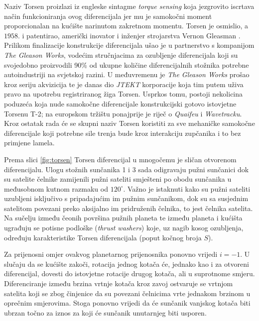\documentclass[11pt]{article}
\numberwithin{equation}{section}%
\begin{document}
Naziv Torsen proizlazi iz engleske sintagme \textit{torque sensing} koja jezgrovito iscrtava način funkcioniranja ovog diferencijala jer mu je samokočni moment proporcionalan na kućište narinutom zakretnom momentu. Torsen je osmislio, a $1958.$ i patentirao, američki inovator i inženjer strojarstva Vernon Gleasman \cite{popsci}. Prilikom finalizacije konstrukcije diferencijala ušao je u partnerstvo s kompanijom \textit{The Gleason Works}, vodećim stručnjacima za ozubljenje diferencijala koji su svojedobno proizvodili 90\% od ukupne količine diferencijalnih stožnika potrebne autoindustriji na svjetskoj razini. U međuvremenu je \textit{The Gleason Works} prošao kroz seriju akvizicija te je danas dio \textit{JTEKT} korporacije koja tim putem uživa pravo na upotrebu registriranog žiga Torsen. Usprkos tomu, postoji nekolicina poduzeća koja nude samokočne diferencijale konstrukcijski gotovo istovjetne Torsenu T-2; na europskom tržištu ponajprije je riječ o \textit{Quaifeu} i \textit{Wavetracku}. Kroz ostatak rada će se skupni naziv Torsen koristiti za sve mehaničke samokočne diferencijale koji potrebne sile trenja bude kroz interakciju zupčanika i to bez primjene lamela.
\par %
Prema slici \ref{fig:torsen} Torsen diferencijal u mnogočemu je sličan otvorenom diferencijalu. Ulogu stožnih sunčanika 1 i 3 sada odigravaju pužni sunčanici dok su satelite čelnike zamijenili pužni sateliti smješteni po obodu sunčanika u međusobnom kutnom razmaku od $120^\circ$. Važno je istaknuti kako su pužni sateliti uzubljeni isključivo s pripadajućim im pužnim sunčanikom, dok su sa susjednim satelitom povezani preko aksijalno im pridruženih čelnika, to jest čelnika satelita. Na sučelju između čeonih površina pužnih planeta te između planeta i kućišta ugrađuju se potisne podloške (\textit{thrust washers}) koje, uz nagib kosog ozubljenja, određuju karakteristike Torsen diferencijala (poput kočnog broja $S$).

Za prijenosni omjer ovakvog planetarnog prijenosnika ponovno vrijedi $i=-1$. U slučaju da se kućište zakoči, rotacija jednog kotača će, jednako kao i za otvoreni diferencijal, dovesti do istovjetne rotacije drugog kotača, ali u suprotnome smjeru. Diferenciranje između brzina vrtnje kotača kroz zavoj ostvaruje se vrtnjom satelita koji se zbog činjenice da su povezani čelnicima vrte jednakom brzinom u oprečnim smjerovima. Stoga ponovno vrijedi da će sunčanik vanjskog kotača biti ubrzan točno za iznos za koji će sunčanik unutarnjeg biti usporen.
\end{document}
